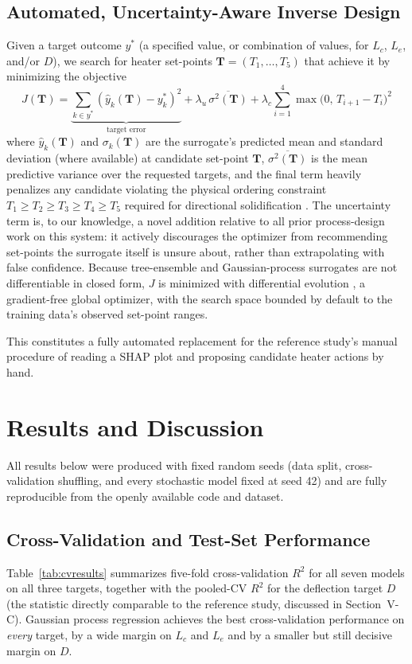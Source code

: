 \documentclass[conference]{IEEEtran}
\begin{document}
\subsection{Automated, Uncertainty-Aware Inverse Design}
Given a target outcome $y^{*}$ (a specified value, or combination of values, for $L_c$, $L_e$, and/or $D$), we search for heater set-points $\mathbf{T}=(T_1,\ldots,T_5)$ that achieve it by minimizing the objective
\begin{equation}
J(\mathbf{T}) = \underbrace{\sum_{k\in y^{*}}\left(\hat y_k(\mathbf{T})-y^{*}_k\right)^2}_{\text{target error}} + \lambda_u\,\overline{\sigma^2(\mathbf{T})} + \lambda_c\sum_{i=1}^{4}\max\!\big(0,\,T_{i+1}-T_i\big)^2
\end{equation}
where $\hat y_k(\mathbf{T})$ and $\sigma_k(\mathbf{T})$ are the surrogate's predicted mean and standard deviation (where available) at candidate set-point $\mathbf{T}$, $\overline{\sigma^2(\mathbf{T})}$ is the mean predictive variance over the requested targets, and the final term heavily penalizes any candidate violating the physical ordering constraint $T_1\geq T_2\geq T_3\geq T_4\geq T_5$ required for directional solidification \cite{zhang_cheng2022}. The uncertainty term is, to our knowledge, a novel addition relative to all prior process-design work on this system: it actively discourages the optimizer from recommending set-points the surrogate itself is unsure about, rather than extrapolating with false confidence. Because tree-ensemble and Gaussian-process surrogates are not differentiable in closed form, $J$ is minimized with differential evolution \cite{storn1997}, a gradient-free global optimizer, with the search space bounded by default to the training data's observed set-point ranges.

This constitutes a fully automated replacement for the reference study's manual procedure of reading a SHAP plot and proposing candidate heater actions by hand.

\section{Results and Discussion}
All results below were produced with fixed random seeds (data split, cross-validation shuffling, and every stochastic model fixed at seed 42) and are fully reproducible from the openly available code and dataset.

\subsection{Cross-Validation and Test-Set Performance}
Table~\ref{tab:cvresults} summarizes five-fold cross-validation $R^2$ for all seven models on all three targets, together with the pooled-CV $R^2$ for the deflection target $D$ (the statistic directly comparable to the reference study, discussed in Section~V-C). Gaussian process regression achieves the best cross-validation performance on \emph{every} target, by a wide margin on $L_c$ and $L_e$ and by a smaller but still decisive margin on $D$.
\end{document}
